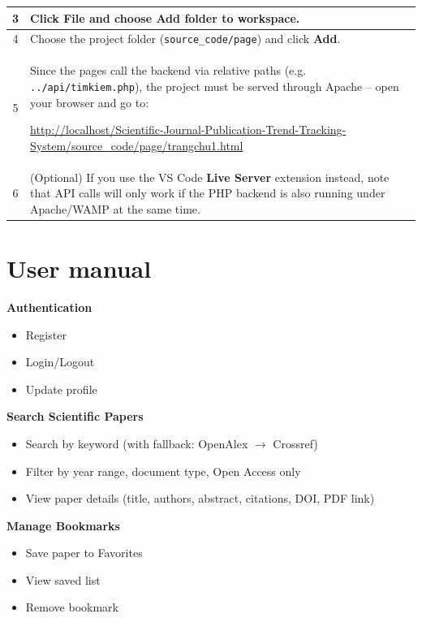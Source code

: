 \documentclass[12pt,a4paper]{article}
\begin{document}
{{{\begin{table}[H]
\begin{tabularx}{\textwidth}{|c|X|}
			3 & Click \textbf{File} and choose \textbf{Add folder to workspace}. \\
			\hline
			
			\rowcolor{bluerow}
			4 & Choose the project folder (\texttt{source\_code/page}) and click \textbf{Add}. \\
			\hline
			
			5 & Since the pages call the backend via relative paths (e.g. \texttt{../api/timkiem.php}), the project must be served through Apache -- open your browser and go to:
			
			\url{http://localhost/Scientific-Journal-Publication-Trend-Tracking-System/source_code/page/trangchu1.html} \\
			\hline
			
			\rowcolor{bluerow}
			6 & (Optional) If you use the VS Code \textbf{Live Server} extension instead, note that API calls will only work if the PHP backend is also running under Apache/WAMP at the same time. \\
			\hline
			
		\end{tabularx}
	\end{table}
}


\section{  User manual}


\textbf{Authentication}
\begin{itemize}[leftmargin=*, itemsep=1pt, topsep=2pt, label=--]
	\item Register
	\item Login/Logout
	\item Update profile
\end{itemize}

\textbf{Search Scientific Papers}
\begin{itemize}[leftmargin=*, itemsep=1pt, topsep=2pt, label=--]
	\item Search by keyword (with fallback: OpenAlex $\rightarrow$ Crossref)
	\item Filter by year range, document type, Open Access only
	\item View paper details (title, authors, abstract, citations, DOI, PDF link)
\end{itemize}

\textbf{Manage Bookmarks}
\begin{itemize}[leftmargin=*, itemsep=1pt, topsep=2pt, label=--]
	\item Save paper to Favorites
	\item View saved list
	\item Remove bookmark
\end{itemize}

}}
\end{document}
